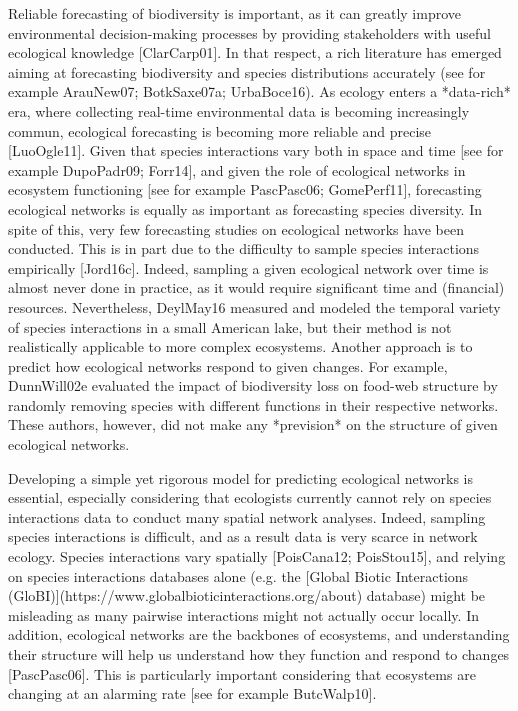Reliable forecasting of biodiversity is important, as it can greatly improve
environmental decision-making processes by providing stakeholders with useful
ecological knowledge [ClarCarp01]. In that respect, a rich literature has
emerged aiming at forecasting biodiversity and species distributions accurately
(see for example ArauNew07; BotkSaxe07a; UrbaBoce16). As ecology enters a
*data-rich* era, where collecting real-time environmental data is becoming
increasingly commun, ecological forecasting is becoming more reliable and
precise [LuoOgle11]. Given that species interactions vary both in space and
time [see for example DupoPadr09; Forr14], and given the role of ecological
networks in ecosystem functioning [see for example PascPasc06; GomePerf11],
forecasting ecological networks is equally as important as forecasting species
diversity. In spite of this, very few forecasting studies on ecological networks
have been conducted. This is in part due to the difficulty to sample species
interactions empirically [Jord16c]. Indeed, sampling a given ecological network
over time is almost never done in practice, as it would require significant time
and (financial) resources. Nevertheless, DeylMay16 measured and modeled the
temporal variety of species interactions in a small American lake, but their
method is not realistically applicable to more complex ecosystems. Another
approach is to predict how ecological networks respond to given changes. For
example, DunnWill02e evaluated the impact of biodiversity loss on food-web
structure by randomly removing species with different functions in their
respective networks. These authors, however, did not make any *prevision* on the
structure of given ecological networks.

Developing a simple yet rigorous model for predicting ecological networks is
essential, especially considering that ecologists currently cannot rely on
species interactions data to conduct many spatial network analyses. Indeed,
sampling species interactions is difficult, and as a result data is very scarce
in network ecology. Species interactions vary spatially [PoisCana12;
PoisStou15], and relying on species interactions databases alone (e.g. the
[Global Biotic Interactions
(GloBI)](https://www.globalbioticinteractions.org/about) database) might be
misleading as many pairwise interactions might not actually occur locally. In
addition, ecological networks are the backbones of ecosystems, and understanding
their structure will help us understand how they function and respond to changes
[PascPasc06]. This is particularly important considering that ecosystems are
changing at an alarming rate [see for example ButcWalp10].

